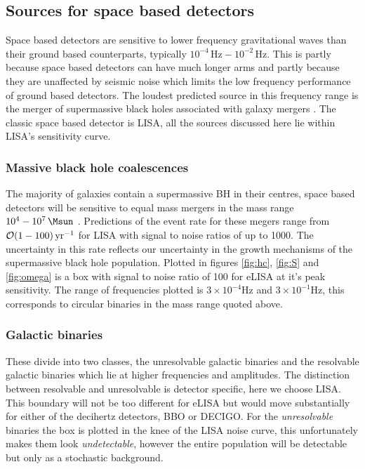 \subsection{Sources for space based detectors}
Space based detectors are sensitive to lower frequency gravitational waves than their ground based counterparts, typically $10^{-4}\,\textrm{Hz}-10^{-2}\,\textrm{Hz}$. This is partly because space based detectors can have much longer arms and partly because they are unaffected by seismic noise which limits the low frequency performance of ground based detectors. The loudest predicted source in this frequency range is the merger of supermassive black holes associated with galaxy mergers \cite{JohnsLivingReview}. The classic space based detector is LISA, all the sources discussed here lie within LISA's sensitivity curve.

\subsubsection{Massive black hole coalescences}
The majority of galaxies contain a supermassive BH in their centres, space based detectors will be sensitive to equal mass mergers in the mass range $10^{4}-10^{7}\,\Msun$ \cite{JohnsLivingReview}. Predictions of the event rate for these megers range from ${\cal{O}}(1-100)\,\textrm{yr}^{-1}$ for LISA with signal to noise ratios of up to 1000. The uncertainty in this rate reflects our uncertainty in the growth mechanisms of the supermassive black hole population. Plotted in figures \ref{fig:hc}, \ref{fig:S} and \ref{fig:omega} is a box with signal to noise ratio of 100 for eLISA at it's peak sensitivity. The range of frequencies plotted is $3\times 10^{-4}\textrm{Hz}$ and $3\times 10^{-1}\textrm{Hz}$, this corresponds to circular binaries in the mass range quoted above.

\subsubsection{Galactic binaries}
These divide into two classes, the unresolvable galactic binaries and the resolvable galactic binaries which lie at higher frequencies and amplitudes. The distinction between resolvable and unresolvable is detector specific, here we choose LISA. This boundary will not be too different for eLISA but would move substantially for either of the decihertz detectors, BBO or DECIGO. For the \emph{unresolvable} binaries the box is plotted in the knee of the LISA noise curve, this unfortunately makes them look \emph{undetectable}, however the entire population will be detectable but only as a stochastic background.

